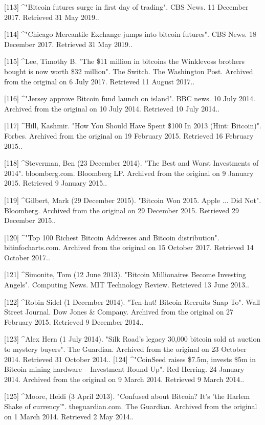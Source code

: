 [113]
^"Bitcoin futures surge in first day of trading". CBS News. 11 December 2017. Retrieved 31 May 2019..

[114]
^"Chicago Mercantile Exchange jumps into bitcoin futures". CBS News. 18 December 2017. Retrieved 31 May 2019..

[115]
^Lee, Timothy B. "The \$11 million in bitcoins the Winklevoss brothers bought is now worth \$32 million". The Switch. The Washington Post. Archived from the original on 6 July 2017. Retrieved 11 August 2017..

[116]
^"Jersey approve Bitcoin fund launch on island". BBC news. 10 July 2014. Archived from the original on 10 July 2014. Retrieved 10 July 2014..

[117]
^Hill, Kashmir. "How You Should Have Spent \$100 In 2013 (Hint: Bitcoin)". Forbes. Archived from the original on 19 February 2015. Retrieved 16 February 2015..

[118]
^Steverman, Ben (23 December 2014). "The Best and Worst Investments of 2014". bloomberg.com. Bloomberg LP. Archived from the original on 9 January 2015. Retrieved 9 January 2015..

[119]
^Gilbert, Mark (29 December 2015). "Bitcoin Won 2015. Apple ... Did Not". Bloomberg. Archived from the original on 29 December 2015. Retrieved 29 December 2015..

[120]
^"Top 100 Richest Bitcoin Addresses and Bitcoin distribution". bitinfocharts.com. Archived from the original on 15 October 2017. Retrieved 14 October 2017..

[121]
^Simonite, Tom (12 June 2013). "Bitcoin Millionaires Become Investing Angels". Computing News. MIT Technology Review. Retrieved 13 June 2013..

[122]
^Robin Sidel (1 December 2014). "Ten-hut! Bitcoin Recruits Snap To". Wall Street Journal. Dow Jones & Company. Archived from the original on 27 February 2015. Retrieved 9 December 2014..

[123]
^Alex Hern (1 July 2014). "Silk Road's legacy 30,000 bitcoin sold at auction to mystery buyers". The Guardian. Archived from the original on 23 October 2014. Retrieved 31 October 2014..
[124]
^"CoinSeed raises \$7.5m, invests \$5m in Bitcoin mining hardware – Investment Round Up". Red Herring. 24 January 2014. Archived from the original on 9 March 2014. Retrieved 9 March 2014..

[125]
^Moore, Heidi (3 April 2013). "Confused about Bitcoin? It's 'the Harlem Shake of currency'". theguardian.com. The Guardian. Archived from the original on 1 March 2014. Retrieved 2 May 2014..


